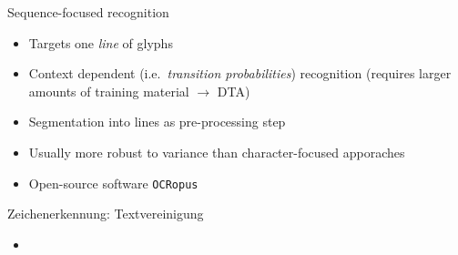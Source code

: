 \documentclass{bbawslides}
\begin{document}
\begin{bbawslide}{Sequence-focused recognition}
  \vspace*{1.5em}%
  \hspace*{-2em}%
  \begin{minipage}{1.05\textwidth}
    \begin{itemize}
      \item Targets one \emph{line} of glyphs
    \end{itemize}
  \end{minipage}
  \begin{center}
  \end{center}
  \begin{minipage}{1.05\textwidth}
    \begin{itemize}
      \item Context dependent (i.e.~\emph{transition probabilities}) recognition (requires larger amounts of training material $\rightarrow$ DTA)
      \item Segmentation into lines as pre-processing step
      \item Usually more robust to variance than character-focused apporaches
      \item Open-source software \texttt{OCRopus}
    \end{itemize}
  \end{minipage}
\end{bbawslide}

\begin{bbawslide}{Zeichenerkennung: Textvereinigung}
  \vspace*{7mm}%
  \centerslidestrue%
  \begin{itemize}
    \item
  \end{itemize}
\end{bbawslide}
\end{document}
